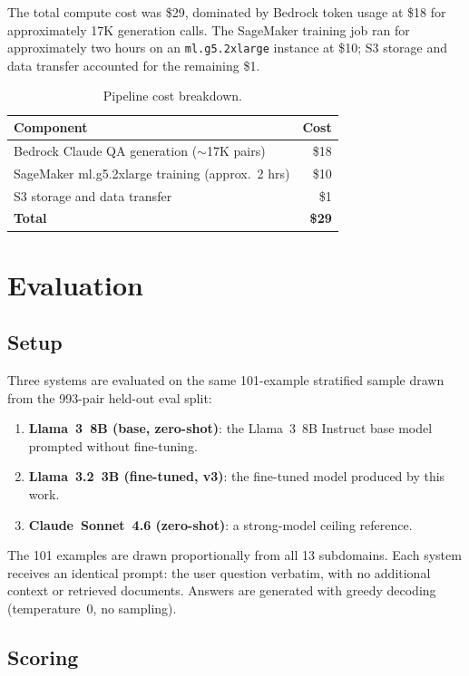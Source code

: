 \documentclass[11pt]{article}
\begin{document}
The total compute cost was \$29, dominated by Bedrock token usage at \$18 for approximately 17K generation calls. The SageMaker training job ran for approximately two hours on an \texttt{ml.g5.2xlarge} instance at \$10; S3 storage and data transfer accounted for the remaining \$1.

\begin{table}[ht]
  \centering
  \caption{Pipeline cost breakdown.}
  \label{tab:costs}
  \begin{tabular}{lr}
    \toprule
    Component & Cost \\
    \midrule
    Bedrock Claude QA generation ($\sim$17K pairs) & \$18 \\
    SageMaker ml.g5.2xlarge training (approx.\ 2 hrs) & \$10 \\
    S3 storage and data transfer & \$1 \\
    \midrule
    \textbf{Total} & \textbf{\$29} \\
    \bottomrule
  \end{tabular}
\end{table}

\section{Evaluation}
\label{sec:evaluation}

\subsection{Setup}

Three systems are evaluated on the same 101-example stratified sample drawn from the 993-pair held-out eval split:
\begin{enumerate}[nosep]
  \item \textbf{Llama~3~8B (base, zero-shot)}: the Llama~3~8B Instruct base model prompted without fine-tuning.
  \item \textbf{Llama~3.2~3B (fine-tuned, v3)}: the fine-tuned model produced by this work.
  \item \textbf{Claude~Sonnet~4.6 (zero-shot)}: a strong-model ceiling reference.
\end{enumerate}

The 101 examples are drawn proportionally from all 13 subdomains. Each system receives an identical prompt: the user question verbatim, with no additional context or retrieved documents. Answers are generated with greedy decoding (temperature~0, no sampling).

\subsection{Scoring}
\end{document}
